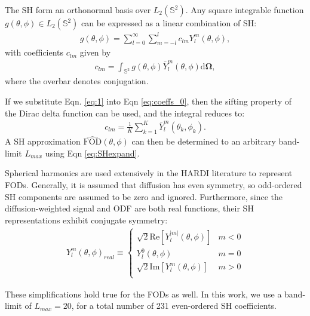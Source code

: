 \documentclass{article}
\begin{document}
The SH form an orthonormal basis over $L_2(\mathbb{S}^2)$. Any
square integrable function $g(\theta, \phi) \in L_2(\mathbb{S}^2)$ can
be expressed as a linear combination of SH:
\begin{align}
  g(\theta, \phi) = \sum_{l=0}^{\infty}\sum_{m=-l}^l c_{lm}Y_l^m(\theta, \phi),
  \label{eq:SHexpand}
\end{align}
with coefficients $c_{lm}$ given by
\begin{align}
  c_{lm} = \int_{\mathbb{S}^2} g(\theta, \phi) \bar{Y}_l^m(\theta, \phi) \mathrm{d}\bm{\Omega},
  \label{eq:coeffs_0}
\end{align}
where the overbar denotes conjugation.

If we substitute Eqn. \ref{eq:1} into Eqn \ref{eq:coeffs_0}, then the sifting property of the Dirac
delta function can be used, and the integral reduces to:
\begin{align}
  c_{lm} = \frac{1}{K}\sum_{k=1}^K \bar{Y}_l^m(\theta_k, \phi_k).
  \label{eq:get_coeffs}
\end{align}
A SH approximation $\hat{\text{FOD}}(\theta, \phi)$ can then be determined to an arbitrary
band-limit $L_{max}$ using Eqn \ref{eq:SHexpand}.

Spherical harmonics are used extensively in the HARDI literature to represent
FODs. Generally, it is assumed that diffusion has even
symmetry, so odd-ordered SH components are assumed to be zero and
ignored. Furthermore, since the diffusion-weighted signal and ODF are both real
functions, their SH representations exhibit conjugate symmetry:
\begin{align}
  Y_{l}^m(\theta, \phi)_{real} \equiv
  \begin{cases}
    \sqrt{2}\text{Re}\left[Y_l^{|m|}(\theta, \phi)\right] & m < 0\\
    Y_l^0(\theta, \phi) & m = 0\\
    \sqrt{2}\text{Im}\left[Y_l^m(\theta, \phi)\right] & m > 0\\
  \end{cases}
  \label{eq:real_Y}
\end{align}

These simplifications hold true for the \uct FODs as well. In this work, we use a
band-limit of $L_{max} = 20$, for a total number of 231 even-ordered SH coefficients.
\end{document}
